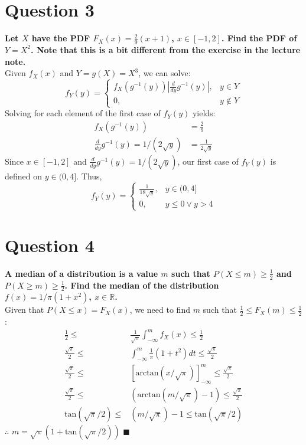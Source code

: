 \documentclass{article}
\newcommand{\R}{\mathbb{R}}
\begin{document}
\section*{Question 3}
\textbf{Let $X$ have the PDF $F_X(x)=\frac{2}{9}(x+1)$, $x\in[-1,2]$. Find the PDF of $Y=X^2$. Note that this is a bit different from the exercise in the lecture note.}
\bigskip \\
Given $f_X(x)$ and $Y=g(X)=X^3$, we can solve:
\[
	f_Y(y) = \begin{cases} f_X\left( g^{-1}(y) \right)|\frac{d}{dy}g^{-1}(y)|, &y\in Y \\ 0, &y\notin Y \end{cases}
\]
Solving for each element of the first case of $f_Y(y)$ yields:
\begin{align*}
	f_X\left( g^{-1}(y) \right)			&= \frac{2}{9}			\\
	\frac{d}{dy}g^{-1}(y)=1/(2\sqrt{y})	&= \frac{1}{2\sqrt{y}}	
\end{align*}
Since $x\in[-1,2]$ and $\frac{d}{dy}g^{-1}(y)=1/(2\sqrt{y})$, our first case of $f_Y(y)$ is defined on $y\in(0,4]$. Thus, 
\[
	f_Y(y) = \begin{cases} \frac{1}{18\sqrt{y}}, &y\in (0,4] \\ 0, &y\leq 0 \lor y>4 \end{cases}
\]



\section*{Question 4}
\textbf{A median of a distribution is a value $m$ such that $P(X\leq m)\geq\frac{1}{2}$ and $P(X\geq m)\geq\frac{1}{2}$. Find the median of the distribution $f(x)=1/\pi(1+x^2)$, $x\in\R$.}
\bigskip \\
Given that $P(X\leq x)=F_X(x)$, we need to find $m$ such that $\frac{1}{2}\leq F_X(m)\leq\frac{1}{2}$:
\begin{align*}
	\frac{1}{2} 			\leq &\frac{1}{\sqrt{\pi}}\int_{-\infty}^m f_X(x) 	\leq \frac{1}{2} 				\\
	\frac{\sqrt{\pi}}{2} 	\leq &\int_{-\infty}^m \frac{1}{\pi}(1+t^2)dt 		\leq \frac{\sqrt{\pi}}{2} 		\\
	\frac{\sqrt{\pi}}{2} 	\leq &[\text{arctan}(x/\sqrt{\pi})]^m_{-\infty}		\leq \frac{\sqrt{\pi}}{2} 		\\
	\frac{\sqrt{\pi}}{2} 	\leq &(\text{arctan}(m/\sqrt{\pi})-1)				\leq \frac{\sqrt{\pi}}{2}		\\
	\text{tan}(\sqrt{\pi}/2)\leq &(m/\sqrt{\pi})-1								\leq \text{tan}(\sqrt{\pi}/2)	
\end{align*}
$\therefore$ $m = \sqrt{\pi}(1 + \text{tan}(\sqrt{\pi}/2))$	$\blacksquare$
\end{document}
